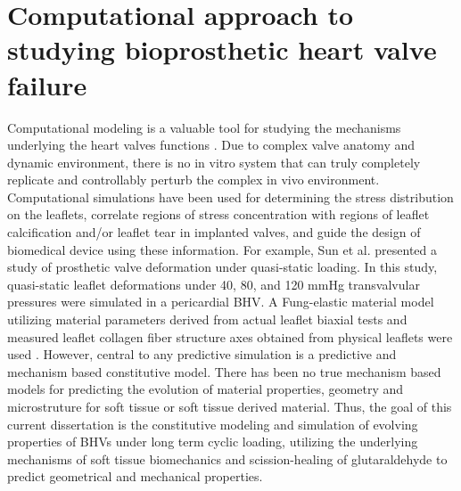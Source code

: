 \section{Computational approach to studying bioprosthetic heart valve failure}

    Computational modeling is a valuable tool for studying the mechanisms underlying the heart valves functions \cite{soares_biomechanical_2016}. Due to complex valve anatomy and dynamic environment, there is no in vitro system that can truly completely replicate and controllably perturb the complex in vivo environment. Computational simulations have been used for determining the stress distribution on the leaflets, correlate regions of stress concentration with regions of leaflet calcification and/or leaflet tear in implanted valves, and guide the design of biomedical device using these information. For example, Sun et al. \cite{sun_simulated_2005} presented a study of prosthetic valve deformation under quasi-static loading. In this study, quasi-static leaflet deformations under 40, 80, and 120 mmHg transvalvular pressures were simulated in a pericardial BHV. A Fung-elastic material model utilizing material parameters derived from actual leaflet biaxial tests and measured leaflet collagen fiber structure axes obtained from physical leaflets were used \cite{sun_finite_2005,sun_effects_2005}. However, central to any predictive simulation is a predictive and mechanism based constitutive model. There has been no true mechanism based models for predicting the evolution of material properties, geometry and microstruture for soft tissue or soft tissue derived material. Thus, the goal of this current dissertation is the constitutive modeling and simulation of evolving properties of BHVs under long term cyclic loading, utilizing the underlying mechanisms of soft tissue biomechanics and scission-healing of glutaraldehyde to predict geometrical and mechanical properties. 


